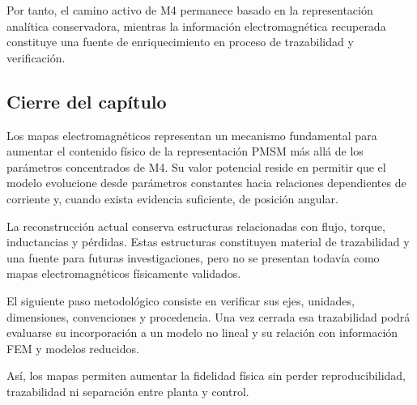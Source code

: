 Por tanto, el camino activo de M4 permanece basado en la representación analítica conservadora, mientras la información electromagnética recuperada constituye una fuente de enriquecimiento en proceso de trazabilidad y verificación.

\subsection{Cierre del capítulo}

Los mapas electromagnéticos representan un mecanismo fundamental para aumentar el contenido físico de la representación PMSM más allá de los parámetros concentrados de M4. Su valor potencial reside en permitir que el modelo evolucione desde parámetros constantes hacia relaciones dependientes de corriente y, cuando exista evidencia suficiente, de posición angular.

La reconstrucción actual conserva estructuras relacionadas con flujo, torque, inductancias y pérdidas. Estas estructuras constituyen material de trazabilidad y una fuente para futuras investigaciones, pero no se presentan todavía como mapas electromagnéticos físicamente validados.

El siguiente paso metodológico consiste en verificar sus ejes, unidades, dimensiones, convenciones y procedencia. Una vez cerrada esa trazabilidad podrá evaluarse su incorporación a un modelo no lineal y su relación con información FEM y modelos reducidos.

Así, los mapas permiten aumentar la fidelidad física sin perder reproducibilidad, trazabilidad ni separación entre planta y control.
